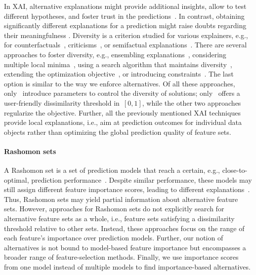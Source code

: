 \documentclass[iicol, sn-basic, Numbered]{sn-jnl} %
\theoremstyle{plain}
\theoremstyle{definition}
\begin{document}
In XAI, alternative explanations might provide additional insights, allow to test different hypotheses, and foster trust in the predictions~\cite{kim2021multi, wang2019designing}.
In contrast, obtaining significantly different explanations for a prediction might raise doubts regarding their meaningfulness \cite{jain2019attention}.
Diversity is a criterion studied for various explainers, e.g., for counterfactuals~\cite{dandl2020multi, karimi2020model, mohammadi2021scaling, mothilal2020explaining, russell2019efficient, wachter2017counterfactual}, criticisms~\cite{kim2016examples}, or semifactual explanations~\cite{artelt2022even}.
There are several approaches to foster diversity, e.g., ensembling explanations~\cite{silva2019produce}, considering multiple local minima~\cite{wachter2017counterfactual}, using a search algorithm that maintains diversity~\cite{dandl2020multi}, extending the optimization objective~\cite{artelt2022even, kim2016examples, mothilal2020explaining}, or introducing constraints~\cite{karimi2020model, mohammadi2021scaling, russell2019efficient}.
The last option is similar to the way we enforce alternatives.
Of all these approaches, only~\cite{artelt2022even, mohammadi2021scaling, mothilal2020explaining} introduce parameters to control the diversity of solutions; only~\cite{mohammadi2021scaling} offers a user-friendly dissimilarity threshold in~$[0,1]$, while the other two approaches regularize the objective.
Further, all the previously mentioned XAI techniques provide local explanations, i.e., aim at prediction outcomes for individual data objects rather than optimizing the global prediction quality of feature sets.

\paragraph{Rashomon sets}

A Rashomon set is a set of prediction models that reach a certain, e.g., close-to-optimal, prediction performance~\cite{fisher2019all}.
Despite similar performance, these models may still assign different feature importance scores, leading to different explanations~\cite{laberge2023partial}.
Thus, Rashomon sets may yield partial information about alternative feature sets.
However, approaches for Rashomon sets do not explicitly search for alternative feature sets as a whole, i.e., feature sets satisfying a dissimilarity threshold relative to other sets.
Instead, these approaches focus on the range of each feature's importance over prediction models.
Further, our notion of alternatives is not bound to model-based feature importance but encompasses a broader range of feature-selection methods.
Finally, we use importance scores from one model instead of multiple models to find importance-based alternatives.
\end{document}
